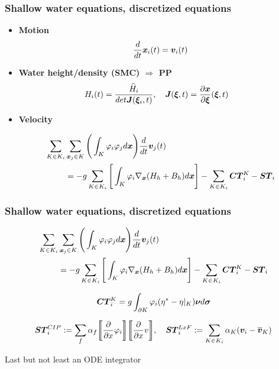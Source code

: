 \documentclass[pt12]{beamer}
\newcommand{\uvec}[2][3]{\boldsymbol{#2\mkern-#1mu}\mkern#1mu}
\begin{document}
\begin{frame}
\frametitle{Shallow water equations, discretized equations}

\begin{itemize}

\item \textbf{Motion}
$$\frac{d}{dt}\uvec{x}_i(t)=\uvec{v}_i(t)$$

\item \textbf{Water height/density (SMC) $\Rightarrow$ PP} 
\begin{align*}
&H_i(t)=\frac{\widehat{H}_i}{det \uvec{J}(\uvec{\xi}_i,t)}, \quad \uvec{J}(\uvec{\xi},t)=\frac{\partial \uvec{x}}{\partial \uvec{\xi}}(\uvec{\xi},t)
\end{align*}

\vspace{-0.5cm}

\item \textbf{Velocity} 

\vspace{-0.5cm}

\begin{align*}
\sum_{K \in K_i} & \sum_{\uvec{x}_j \in K} \Bigg(\int_K \varphi_i \varphi_j d \uvec{x}\Bigg) \frac{d}{dt}\uvec{v}_j(t)\\
&= -g \sum_{K \in K_i} \Bigg[ \int_K \varphi_i \nabla_{\uvec{x}}(H_h+B_h)  d\uvec{x}\Bigg] - \sum_{K \in K_i} \uvec{CT}_i^K -\uvec{ST}_i
\end{align*}

\end{itemize}


\end{frame}


\begin{frame}
\frametitle{Shallow water equations, discretized equations}


\begin{align*}
\sum_{K \in K_i} & \sum_{\uvec{x}_j \in K} \Bigg(\int_K \varphi_i \varphi_j d \uvec{x}\Bigg) \frac{d}{dt}\uvec{v}_j(t)\\
&= -g \sum_{K \in K_i} \Bigg[ \int_K \varphi_i \nabla_{\uvec{x}}(H_h+B_h)  d\uvec{x}\Bigg] - \sum_{K \in K_i} \uvec{CT}_i^K -\uvec{ST}_i
\end{align*}

\begin{align*}
\uvec{CT}_i^K=g\int_{\partial K} \varphi_i (\eta^*-\eta\vert_K) \uvec{\nu} d \uvec{\sigma}
\end{align*}



\begin{align*}
\uvec{ST}^{CIP}_i:=\sum_{f}\alpha_f  \biggl\llbracket \frac{\partial}{\partial x} \varphi_i\biggr\rrbracket  \biggl\llbracket \frac{\partial}{\partial x} v \biggr\rrbracket, \quad \uvec{ST}^{LxF}_i:= \sum_{K \in K_i} \alpha_K (\uvec{v}_i-\overline{\uvec{v}}_K)
\end{align*}

\centering

Last but not least an ODE integrator

\end{frame}
\end{document}

